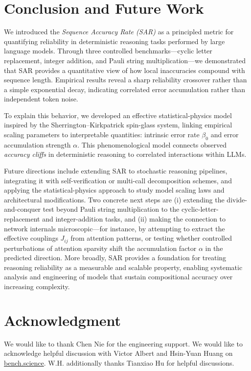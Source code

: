 \documentclass{article}
\theoremstyle{plain}
\begin{document}
\section{Conclusion and Future Work}

We introduced the \emph{Sequence Accuracy Rate (SAR)} as a principled metric for quantifying reliability in deterministic reasoning tasks performed by large language models. Through three controlled benchmarks—cyclic letter replacement, integer addition, and Pauli string multiplication—we demonstrated that SAR provides a quantitative view of how local inaccuracies compound with sequence length. Empirical results reveal a sharp reliability crossover rather than a simple exponential decay, indicating correlated error accumulation rather than independent token noise.

To explain this behavior, we developed an effective statistical-physics model inspired by the Sherrington–Kirkpatrick spin-glass system, linking empirical scaling parameters to interpretable quantities: intrinsic error rate $\beta_0$ and error accumulation strength $\alpha$. This phenomenological model connects observed \emph{accuracy cliffs} in deterministic reasoning to correlated interactions within LLMs.

Future directions include extending SAR to stochastic reasoning pipelines, integrating it with self-verification or multi-call decomposition schemes, and applying the statistical-physics approach to study model scaling laws and architectural modifications. Two concrete next steps are (i) extending the divide-and-conquer test beyond Pauli string multiplication to the cyclic-letter-replacement and integer-addition tasks, and (ii) making the connection to network internals microscopic---for instance, by attempting to extract the effective couplings $J_{ij}$ from attention patterns, or testing whether controlled perturbations of attention sparsity shift the accumulation factor $\alpha$ in the predicted direction. More broadly, SAR provides a foundation for treating reasoning reliability as a measurable and scalable property, enabling systematic analysis and engineering of models that sustain compositional accuracy over increasing complexity.

\section{Acknowledgment}
We would like to thank Chen Nie for the engineering support. We would like to acknowledge helpful discussion with Victor Albert and Hsin-Yuan Huang on \href{https://bench.science}{bench.science}. W.H. additionally thanks Tianxiao Hu for helpful discussions.
\end{document}
